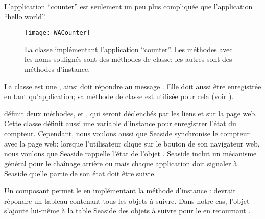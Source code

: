 \documentclass[a4paper,10pt,twoside]{book}
\begin{document}
L'application ``counter'' est seulement un peu plus compliquée que
l'application ``hello world''.

\begin{figure}[ht]
\begin{center}
\texttt{[image: WACounter]}
\caption{La classe  implémentant l'application
  ``counter''. Les méthodes avec les noms soulignés sont des méthodes
  de classe; les autres sont des méthodes d'instance.}
\end{center}
\end{figure}

La classe   est une ,
ainsi  doit répondre  au message 
 .
Elle doit aussi être enregistrée en tant qu'application; sa méthode de
classe  est utilisée pour cela (voir
).

 définit deux méthodes,  et ,
qui seront déclenchés par les liens \link{++} et \link{--\,--} sur la
page web.
Cette classe définit aussi une variable d'instance 
  pour enregistrer l'état du compteur.
Cependant, nous voulons aussi que Seaside synchronise le compteur avec la page web:
lorsque l'utilisateur clique sur le bouton \backbtn{} de son
navigateur web, nous voulons que Seaside rappelle l'état de l'objet
.
Seaside inclut un mécanisme général pour le chaînage arrière ou
\backtracking mais chaque application doit signaler à Seaside quelle
partie de son état doit être suivie.

Un composant permet le \backtracking en implémentant la méthode
d'instance :
 devrait répondre un tableau contenant tous les objets à
suivre. Dans notre cas, l'objet  s'ajoute lui-même à la
table Seaside des objets à suivre pour le \backtracking en retournant
.
\end{document}
